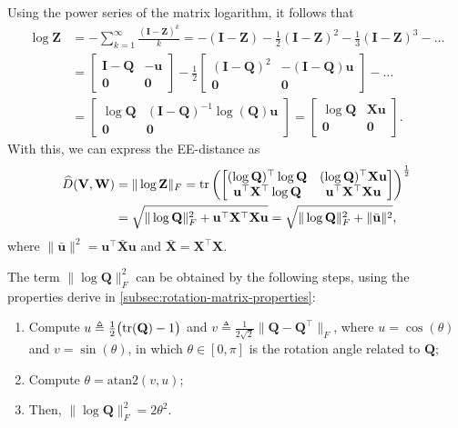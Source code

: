 Using the power series of the matrix logarithm, it follows that
\begin{align*}
    \log\mathbf{Z} &= -\sum_{k=1}^\infty \frac{(\mathbf{I} - \mathbf{Z})^k}{k} = - (\mathbf{I} - \mathbf{Z}) - \frac{1}{2}(\mathbf{I} - \mathbf{Z})^2 - \frac{1}{3} (\mathbf{I} - \mathbf{Z})^3 - \dots\\
    &=\begin{bmatrix}
        \mathbf{I} - \mathbf{Q} & -\mathbf{u}\\\mathbf{0} & \mathbf{0}
    \end{bmatrix} -
    \frac{1}{2}\begin{bmatrix}
        (\mathbf{I} - \mathbf{Q})^2 & -(\mathbf{I} - \mathbf{Q})\mathbf{u}\\\mathbf{0} & \mathbf{0}
    \end{bmatrix} - \dots\\
    &= \begin{bmatrix}
        \log\mathbf{Q} & (\mathbf{I} - \mathbf{Q})^{-1}\log(\mathbf{Q})\mathbf{u}\\\mathbf{0} & \mathbf{0}
    \end{bmatrix} = \begin{bmatrix}
        \log\mathbf{Q} & \mathbf{X}\mathbf{u}\\\mathbf{0} & \mathbf{0}
    \end{bmatrix}.
\end{align*}
With this, we can express the EE-distance as
\begin{align}
    \begin{split}
    \widehat{D}(\mathbf{V}, \mathbf{W}) &= \|\log\mathbf{Z}\|_F = \operatorname{tr}\left(
        \begin{bmatrix}
            (\log\mathbf{Q})^\top\log\mathbf{Q} & (\log\mathbf{Q})^\top\mathbf{X}\mathbf{u}\\
            \mathbf{u}^\top\mathbf{X}^\top\log\mathbf{Q} & \mathbf{u}^\top\mathbf{X}^\top\mathbf{X}\mathbf{u}
        \end{bmatrix}
    \right)^\frac{1}{2}\\
        &= \sqrt{\|\log\mathbf{Q}\|_F^2 + \mathbf{u}^\top\mathbf{X}^\top\mathbf{X}\mathbf{u}} = \sqrt{\|\log\mathbf{Q}\|_F^2 + \|\bar{\mathbf{u}}\|^2},
    \end{split}
\end{align}
where $\|\bar{\mathbf{u}}\|^2 = \mathbf{u}^\top\bar{\mathbf{X}}\mathbf{u}$ and $\bar{\mathbf{X}}=\mathbf{X}^\top\mathbf{X}$.

The term $\|\log\mathbf{Q}\|_F^2$ can be obtained by the following steps, using the properties derive in \cref{subsec:rotation-matrix-properties}:
\begin{enumerate}
    \item Compute $u \triangleq \frac{1}{2}\bigl(\operatorname{tr}(\mathbf{Q})-1\bigr)$ and $v \triangleq \frac{1}{2\sqrt{2}}\|\mathbf{Q}{-}\mathbf{Q}^{\top}\|_F$, where $u = \cos(\theta)$ and $v=\sin(\theta)$, in which $\theta \in [0, \pi]$ is the rotation angle related to $\mathbf{Q}$;
    \item Compute $\theta = \text{atan2}(v,u)$;
    \item Then, $\|\log\mathbf{Q}\|_F^2 = 2\theta^2$.
\end{enumerate}

